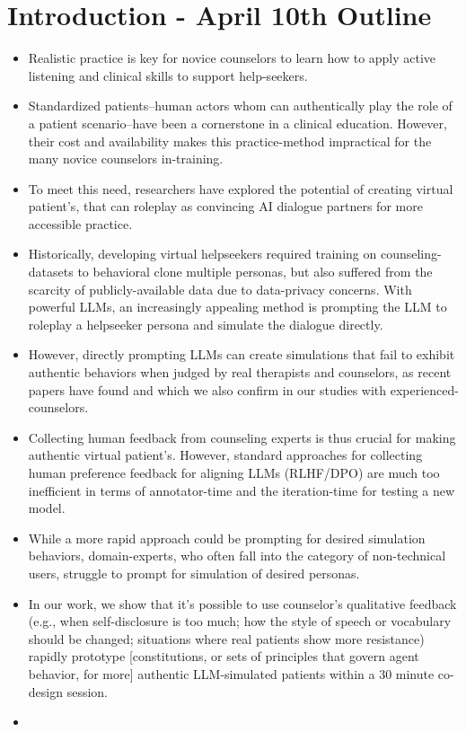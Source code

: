 \section{Introduction - April 10th Outline}
\begin{itemize}
\item     Realistic practice is key for novice counselors to learn how to apply active listening and clinical skills to support help-seekers.
\item     Standardized patients--human actors whom can authentically play the role of a patient scenario--have been a cornerstone in a clinical education. However, their cost and availability makes this practice-method impractical for the many novice counselors in-training.
\item   To meet this need, researchers have explored the potential of creating virtual patient's, that can roleplay as convincing AI dialogue partners for more  accessible practice.
\item   Historically, developing virtual helpseekers required training on counseling-datasets to behavioral clone multiple personas, but also suffered from the scarcity of publicly-available data due to data-privacy concerns. With powerful LLMs, an increasingly appealing method is prompting the LLM to roleplay a helpseeker persona and simulate the dialogue directly.
\item   However, directly prompting LLMs can create simulations that fail to exhibit authentic behaviors when judged by real therapists and counselors, as recent papers have found and which we also confirm in our studies with experienced-counselors.
\item Collecting human feedback from counseling experts is thus crucial for making authentic virtual patient's.  However, standard approaches for collecting human preference feedback for aligning LLMs (RLHF/DPO) are much too inefficient in terms of annotator-time and the iteration-time for testing a new model.
\item While a more rapid approach could be prompting for desired simulation behaviors, domain-experts, who often fall into the category of non-technical users, struggle to prompt for simulation of desired personas. 
\item In our work, we show that it's possible to use counselor's qualitative feedback (e.g., when self-disclosure is too much;  how the style of speech or vocabulary should be changed;  situations where real patients show more resistance) rapidly prototype [constitutions, or sets of principles that govern agent behavior, for more] authentic LLM-simulated patients within a 30 minute co-design session.
\item 
\end{itemize}
\fi
